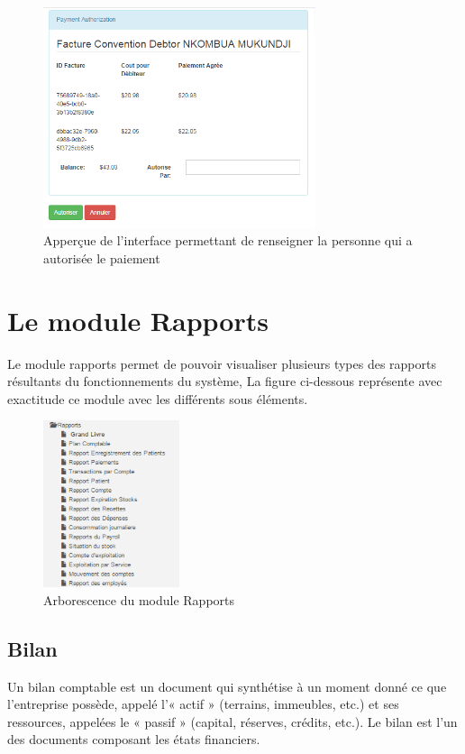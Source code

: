 \documentclass[12pt,a4paper]{report}
\begin{document}
\begin{figure}[h]
\begin{center}
\includegraphics[width=8cm]{pic/PCConfirm.png}
\end{center}
\caption{Apperçue de l'interface permettant de renseigner la personne qui a autorisée le paiement}
\label{Apperçue de l'interface permettant de renseigner la personne qui a autorisée le paiement}
\end{figure}



\newpage
\chapter{Le module Rapports}        
Le module rapports permet de pouvoir visualiser plusieurs types des rapports résultants du fonctionnements du système, La figure ci-dessous représente avec exactitude ce module avec les différents sous éléments.

\begin{figure}[h]
\begin{center}
\includegraphics[width=4cm]{pic/ArboReport.png}
\end{center}
\caption{Arborescence du module Rapports}
\label{Arborescence du module Rapports}
\end{figure}

\newpage
\section{Bilan}
Un bilan  comptable est un document qui synthétise à un moment donné ce que l'entreprise possède, appelé l'« actif » (terrains, immeubles, etc.) et ses ressources, appelées le « passif » (capital, réserves, crédits, etc.). Le bilan est l'un des documents composant les états financiers.
\end{document}
